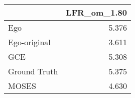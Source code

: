 \begin{tabular}{lr}
\toprule
{} & LFR_om_1.80 \\
\midrule
Ego          &       5.376 \\
Ego-original &       3.611 \\
GCE          &       5.308 \\
Ground Truth &       5.375 \\
MOSES        &       4.630 \\
\bottomrule
\end{tabular}
